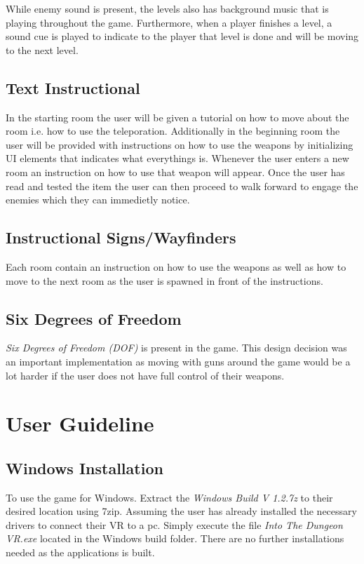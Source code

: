 \documentclass[12pt, twoside]{article}
\begin{document}
While enemy sound is present, the levels also has background music that is
playing throughout the game. Furthermore, when a player finishes a level, a
sound cue is played to indicate to the player that level is done and will be
moving to the next level.

\subsection{Text Instructional}
In the starting room the user will be given a tutorial on how to move about the
room i.e. how to use the teleporation. Additionally in the beginning room the
user will be provided with instructions on how to use the weapons by initializing UI elements that indicates what everythings is. Whenever the
user enters a new room an instruction on how to use that weapon will appear.
Once the user has read and tested the item the user can then proceed to walk forward to engage the enemies which they can immedietly notice. 

\subsection{Instructional Signs/Wayfinders}
Each room contain an instruction on how to use the weapons as well as how to
move to the next room as the user is spawned in front of the instructions.

\subsection{Six Degrees of Freedom}
\emph{Six Degrees of Freedom (DOF)} is present in the game. This design decision
was an important implementation as moving with guns around the game would be a
lot harder if the user does not have full control of their weapons.
\newpage

\section{User Guideline}

\subsection{Windows Installation}
To use the game for Windows. Extract the \emph{Windows Build V 1.2.7z} to their desired location using 7zip. Assuming the user has already installed the
necessary drivers to connect their VR to a pc. Simply execute the file \emph{Into The
Dungeon VR.exe} located in the Windows build folder. There are no further installations needed as the applications is built.
\end{document}
